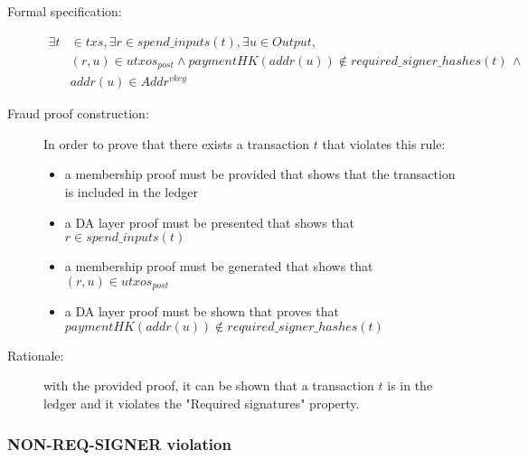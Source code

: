 \documentclass[../midgard.tex]{subfiles}
\begin{document}
\begin{description}

\item[Formal specification:]
\begin{equation*}
\begin{split}
    \exists t & \in txs, \exists r \in spend\_inputs(t), \exists u \in Output, \\
    & (r, u) \in utxos_{post} \land paymentHK(addr(u)) \notin required\_signer\_hashes(t) \, \land \\
    & addr(u) \in Addr^{vkey}
\end{split}
\end{equation*}

\item[Fraud proof construction:] In order to prove that there exists a transaction $t$ that violates this rule:
\begin{itemize}
    \item a membership proof must be provided that shows that the transaction is included in the ledger
    \item a DA layer proof must be presented that shows that $r \in spend\_inputs(t)$
    \item a membership proof must be generated that shows that $(r, u) \in utxos_{post}$
    \item a DA layer proof must be shown that proves that \\ $paymentHK(addr(u)) \notin required\_signer\_hashes(t)$
\end{itemize}

\item[Rationale:] with the provided proof, it can be shown that a transaction $t$ is in the ledger and it violates the "Required signatures" property.

\end{description}

\subsubsection{NON-REQ-SIGNER violation}
\label{violation:NON-REQ-SIGNER}
\end{document}
